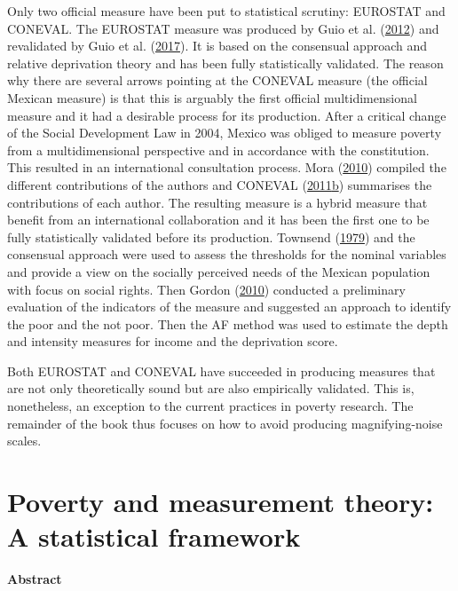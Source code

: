 \documentclass[]{book}
\begin{document}
Only two official measure have been put to statistical scrutiny: EUROSTAT and CONEVAL. The EUROSTAT measure was produced by Guio et al. (\protect\hyperlink{ref-Guio2012}{2012}) and revalidated by Guio et al. (\protect\hyperlink{ref-Guio2017}{2017}). It is based on the consensual approach and relative deprivation theory and has been fully statistically validated. The reason why there are several arrows pointing at the CONEVAL measure (the official Mexican measure) is that this is arguably the first official multidimensional measure and it had a desirable process for its production. After a critical change of the Social Development Law in 2004, Mexico was obliged to measure poverty from a multidimensional perspective and in accordance with the constitution. This resulted in an international consultation process. Mora (\protect\hyperlink{ref-Mora2010}{2010}) compiled the different contributions of the authors and CONEVAL (\protect\hyperlink{ref-CONEVAL2011d}{2011}\protect\hyperlink{ref-CONEVAL2011d}{b}) summarises the contributions of each author. The resulting measure is a hybrid measure that benefit from an international collaboration and it has been the first one to be fully statistically validated before its production. Townsend (\protect\hyperlink{ref-Townsend1979}{1979}) and the consensual approach were used to assess the thresholds for the nominal variables and provide a view on the socially perceived needs of the Mexican population with focus on social rights. Then Gordon (\protect\hyperlink{ref-Gordon2010}{2010}) conducted a preliminary evaluation of the indicators of the measure and suggested an approach to identify the poor and the not poor. Then the AF method was used to estimate the depth and intensity measures for income and the deprivation score.

Both EUROSTAT and CONEVAL have succeeded in producing measures that are not only theoretically sound but are also empirically validated. This is, nonetheless, an exception to the current practices in poverty research. The remainder of the book thus focuses on how to avoid producing magnifying-noise scales.

\hypertarget{poverty-and-measurement-theory-a-statistical-framework}{%
\chapter{Poverty and measurement theory: A statistical framework}\label{poverty-and-measurement-theory-a-statistical-framework}}

\textbf{Abstract}
\end{document}
